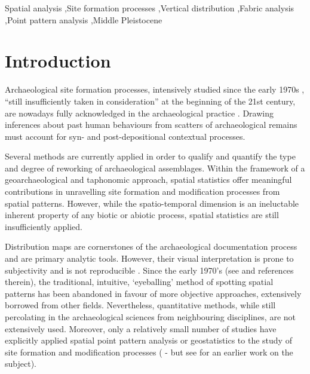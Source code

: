 \documentclass[preprint,authoryear,times]{elsarticle} %
\begin{document}
\begin{frontmatter}
  \begin{keyword}
    Spatial analysis \sep Site formation processes \sep Vertical distribution \sep Fabric analysis \sep Point pattern analysis \sep Middle Pleistocene
  \end{keyword}
  
\end{frontmatter}

\linenumbers

\section{Introduction}

Archaeological site formation processes, intensively studied since the early 1970s \citep[][among others]{Isaac1967,Schiffer1972,Schiffer1983,Schiffer1987,Shackley1978,Wood1978,Schick1984,Schick1986,Schick1987,Petraglia1987,Petraglia1994} %
, ``still insufficiently taken in consideration'' \citep{Texier2000} at the beginning of the 21st century, are nowadays fully acknowledged in the archaeological practice \citep[][among others]{Villa2004,Bailey2007,Brantingham2007,Malinsky-Buller2011,Vaquero2012,Bargallo2016}. %
Drawing inferences about past human behaviours from scatters of archaeological remains must account for syn- and post-depositional contextual processes.

Several methods are currently applied in order to qualify and quantify the type and degree of reworking of archaeological assemblages. Within the framework of a geoarchaeological and taphonomic approach, spatial statistics offer meaningful contributions in unravelling site formation and modification processes from spatial patterns. However, while the spatio-temporal dimension is an ineluctable inherent property of any biotic or abiotic process, spatial statistics are still insufficiently applied.

Distribution maps are cornerstones of the archaeological documentation process and are primary analytic tools. However, their visual interpretation is prone to subjectivity and is not reproducible \citep{Bevan2013a}. Since the early 1970's (see \cite{Hodder1976,Orton1982} and references therein), the traditional, intuitive, `eyeballing' method of spotting spatial patterns has been abandoned in favour of more objective approaches, extensively borrowed from other fields. Nevertheless, quantitative methods, while still percolating in the archaeological sciences from neighbouring disciplines, are not extensively used. Moreover, only a relatively small number of studies have explicitly applied spatial point pattern analysis or geostatistics to the study of site formation and modification processes (\cite{Lenoble2008,Dominguez-Rodrigo2014b,Dominguez-Rodrigo2014c,Dominguez-Rodrigo2017,Carrer2015,Giusti2016,Organista2017} - but see \cite{Hivernel1984} for an earlier work on the subject).
\end{document}
